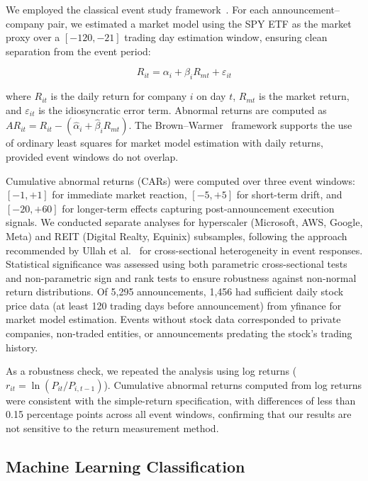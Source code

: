 \documentclass[5p,12pt]{elsarticle}
\begin{document}
We employed the classical event study framework~\cite{MacKinlay1997Event,Brown1985Daily,Kothari2007Econometrics}. For each announcement--company pair, we estimated a market model using the SPY ETF as the market proxy over a $[-120, -21]$ trading day estimation window, ensuring clean separation from the event period:

\begin{equation}
R_{it} = \alpha_i + \beta_i R_{mt} + \varepsilon_{it}
\end{equation}

where $R_{it}$ is the daily return for company $i$ on day $t$, $R_{mt}$ is the market return, and $\varepsilon_{it}$ is the idiosyncratic error term. Abnormal returns are computed as $AR_{it} = R_{it} - (\hat{\alpha}_i + \hat{\beta}_i R_{mt})$. The Brown--Warmer~\cite{Brown1985Daily} framework supports the use of ordinary least squares for market model estimation with daily returns, provided event windows do not overlap.

Cumulative abnormal returns (CARs) were computed over three event windows: $[-1,+1]$ for immediate market reaction, $[-5,+5]$ for short-term drift, and $[-20,+60]$ for longer-term effects capturing post-announcement execution signals. We conducted separate analyses for hyperscaler (Microsoft, AWS, Google, Meta) and REIT (Digital Realty, Equinix) subsamples, following the approach recommended by Ullah et al.~\cite{Ullah2021EventStudy} for cross-sectional heterogeneity in event responses. Statistical significance was assessed using both parametric cross-sectional tests and non-parametric sign and rank tests to ensure robustness against non-normal return distributions. Of 5,295 announcements, 1,456 had sufficient daily stock price data (at least 120 trading days before announcement) from yfinance for market model estimation. Events without stock data corresponded to private companies, non-traded entities, or announcements predating the stock's trading history.

As a robustness check, we repeated the analysis using log returns ($r_{it} = \ln(P_{it}/P_{i,t-1})$). Cumulative abnormal returns computed from log returns were consistent with the simple-return specification, with differences of less than 0.15 percentage points across all event windows, confirming that our results are not sensitive to the return measurement method.

\subsection{Machine Learning Classification}
\label{sec:ml_classification}
\end{document}
